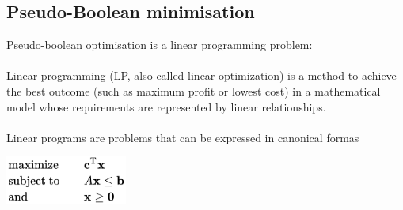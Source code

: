 \subsection{Pseudo-Boolean minimisation}
Pseudo-boolean optimisation is a linear programming problem: \\\\
\noindent\makebox[\linewidth]{\rule{\linewidth}{0.4pt}}
Linear programming (LP, also called linear optimization) is a method to achieve the best
outcome (such as maximum profit or lowest cost) in a mathematical model whose requirements
are represented by linear relationships. \\\\
Linear programs are problems that can be expressed in canonical formas

\begin{center}
	\includegraphics[width=0.3\textwidth]{Figures/linearProgramming.png}
\end{center}

